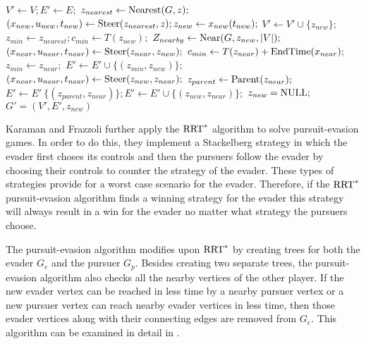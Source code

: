 \begin{algorithm}
\caption{$\textnormal{Extend}(G,z)$ \cite{karaman}}\label{extend}
\begin{algorithmic}[1]
	\State $V' \leftarrow V; E' \leftarrow E;$
	\State $z_{nearest} \leftarrow \textnormal{Nearest}(G,z);$
	\State $(x_{new},u_{new},t_{new}) \leftarrow \textnormal{Steer}(z_{nearest},z); z_{new} \leftarrow x_{new}(t_{new});$
		\State $V' \leftarrow V' \cup \{z_{new}\};$
		\State $z_{min} \leftarrow z_{nearest}; c_{min} \leftarrow T(z_{new});$
		\State $Z_{nearby} \leftarrow \textnormal{Near}(G,z_{new},|V|);$
		 \do{}
			\State $(x_{near},u_{near},t_{near}) \leftarrow \textnormal{Steer}(z_{near},z_{new});$
				\State $c_{min} \leftarrow T(z_{near})+\textnormal{EndTime}(x_{near});$
				\State $z_{min} \leftarrow z_{near};$
			\EndIf
		\EndFor
		\State $E' \leftarrow E' \cup \{(z_{min},z_{new})\};$
		 \do{}
			\State $(x_{near},u_{near},t_{near}) \leftarrow \textnormal{Steer}(z_{new},z_{near});$
				\State $z_{parent} \leftarrow \textnormal{Parent}(z_{near});$
				\State $E' \leftarrow E' \ \{(z_{parent},z_{near})\};E' \leftarrow E' \cup \{(z_{new},z_{near})\};$
			\EndIf
		\EndFor
		\Else
			\State $z_{new} = \textnormal{NULL};$
	\EndIf
	\State
	\Return $G' = (V',E',z_{new})$
\end{algorithmic}
\end{algorithm}

Karaman and Frazzoli further apply the $\textnormal{RRT}^*$ algorithm to solve pursuit-evasion games. In order to do this, they implement a Stackelberg strategy in which the evader first choses its controls and then the pursuers  follow the evader by choosing their controls to counter the strategy of the evader. These types of strategies provide for a worst case scenario for the evader. Therefore, if the $\textnormal{RRT}^*$ pursuit-evasion algorithm finds a winning strategy for the evader this strategy will always result in a win for the evader no matter what strategy the pursuers choose.

The pursuit-evasion algorithm modifies upon $\textnormal{RRT}^*$ by creating trees for both the evader $G_e$ and the pursuer $G_p$. Besides creating two separate trees, the pursuit-evasion algorithm also checks all the nearby vertices of the other player. If the new evader vertex can be reached in less time by a nearby pursuer vertex or a new pursuer vertex can reach nearby evader vertices in less time, then those evader vertices along with their connecting edges are removed from $G_e$. This algorithm can be examined in detail in .\cite{karaman}
         
